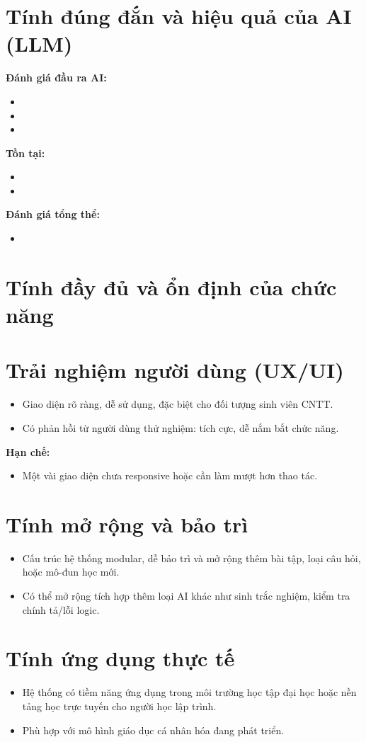 \section{Tính đúng đắn và hiệu quả của AI (LLM)}
\textbf{Đánh giá đầu ra AI:}
\begin{itemize}
    \item 
    \item 
    \item 
\end{itemize}

\textbf{Tồn tại:}
\begin{itemize}
    \item 
    \item 
\end{itemize}

\textbf{Đánh giá tổng thể:}
\begin{itemize}
    \item \checkmark 
\end{itemize}


\section{Tính đầy đủ và ổn định của chức năng}
\section{Trải nghiệm người dùng (UX/UI)}
\begin{itemize}
    \item Giao diện rõ ràng, dễ sử dụng, đặc biệt cho đối tượng sinh viên CNTT.
    \item Có phản hồi từ người dùng thử nghiệm: tích cực, dễ nắm bắt chức năng.
\end{itemize}

\textbf{Hạn chế:}
\begin{itemize}
    \item Một vài giao diện chưa responsive hoặc cần làm mượt hơn thao tác.
\end{itemize}

\section{Tính mở rộng và bảo trì}
\begin{itemize}
    \item Cấu trúc hệ thống modular, dễ bảo trì và mở rộng thêm bài tập, loại câu hỏi, hoặc mô-đun học mới.
    \item Có thể mở rộng tích hợp thêm loại AI khác như sinh trắc nghiệm, kiểm tra chính tả/lỗi logic.
\end{itemize}

\section{Tính ứng dụng thực tế}
\begin{itemize}
    \item Hệ thống có tiềm năng ứng dụng trong môi trường học tập đại học hoặc nền tảng học trực tuyến cho người học lập trình.
    \item Phù hợp với mô hình giáo dục cá nhân hóa đang phát triển.
\end{itemize}

